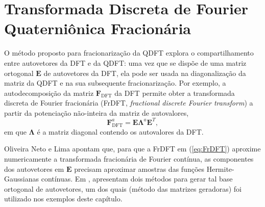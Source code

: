 \section{Transformada Discreta de Fourier Quaterni\^onica Fracion\'aria}
\label{sec:FrQDFT}

O m\'etodo proposto para fracionariza\c c\~ao da QDFT explora o compartilhamento entre autovetores da DFT e da QDFT: uma vez que se disp\~oe de uma matriz ortogonal $ \mathbf{E} $ de autovetores da DFT, ela pode ser usada na diagonaliza\c c\~ao da matriz da QDFT e na sua subsequente fracionariza\c c\~ao. Por exemplo, a autodecomposi\c c\~ao da matriz $ \mathbf{F}_{\text{DFT}} $ da DFT permite obter a transformada discreta de Fourier fracion\'aria (FrDFT, \textit{fractional discrete Fourier transform}) a partir da potencia\c c\~ao n\~ao-inteira da matriz de autovalores,
\begin{equation}
\label{eq:FrDFT}
\mathbf{F}_{\text{DFT}}^a = \mathbf{E} \boldsymbol{\Lambda}^a \mathbf{E}^T,
\end{equation}
em que $ \boldsymbol{\Lambda}$ \'e a matriz diagonal contendo os autovalores da DFT.

Oliveira Neto e Lima \cite{de2017discrete} apontam que, para que a FrDFT em (\ref{eq:FrDFT}) aproxime numericamente a transformada fracion\'aria de Fourier cont\'inua, as componentes dos autovetores em $ \mathbf{E} $ precisam aproximar amostras das fun\c c\~oes Hermite-Gaussianas cont\'inuas. Em \cite{de2017discrete}, apresentam dois m\'etodos para gerar tal base ortogonal de autovetores, um dos quais (m\'etodo das matrizes geradoras) foi utilizado nos exemplos deste cap\'itulo.

